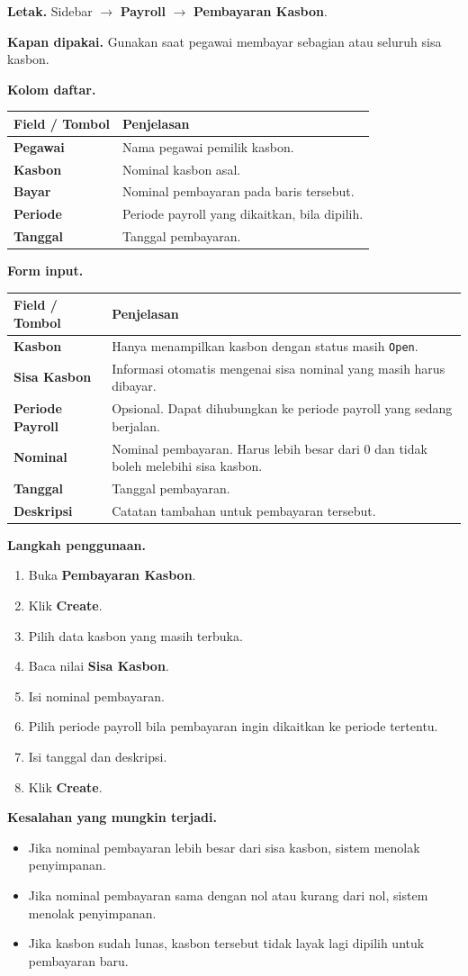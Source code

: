 \documentclass[12pt,a4paper]{article}
\providecommand{\textrightarrow}{\ensuremath{\rightarrow}}
\newcommand{\FieldTableStart}{
\begin{longtable}{L{0.30\textwidth}L{0.64\textwidth}}
\toprule
\textbf{Field / Tombol} & \textbf{Penjelasan} \\
\midrule
\endhead
}
\newcommand{\FieldTableEnd}{
\bottomrule
\end{longtable}
}
\newcommand{\FieldRow}[2]{
\textbf{#1} & #2 \\
}
\begin{document}
\textbf{Letak.} Sidebar \textrightarrow{} \textbf{Payroll} \textrightarrow{} \textbf{Pembayaran Kasbon}.

\textbf{Kapan dipakai.} Gunakan saat pegawai membayar sebagian atau seluruh sisa kasbon.

\textbf{Kolom daftar.}
\FieldTableStart
\FieldRow{Pegawai}{Nama pegawai pemilik kasbon.}
\FieldRow{Kasbon}{Nominal kasbon asal.}
\FieldRow{Bayar}{Nominal pembayaran pada baris tersebut.}
\FieldRow{Periode}{Periode payroll yang dikaitkan, bila dipilih.}
\FieldRow{Tanggal}{Tanggal pembayaran.}
\FieldTableEnd

\textbf{Form input.}
\FieldTableStart
\FieldRow{Kasbon}{Hanya menampilkan kasbon dengan status masih \texttt{Open}.}
\FieldRow{Sisa Kasbon}{Informasi otomatis mengenai sisa nominal yang masih harus dibayar.}
\FieldRow{Periode Payroll}{Opsional. Dapat dihubungkan ke periode payroll yang sedang berjalan.}
\FieldRow{Nominal}{Nominal pembayaran. Harus lebih besar dari 0 dan tidak boleh melebihi sisa kasbon.}
\FieldRow{Tanggal}{Tanggal pembayaran.}
\FieldRow{Deskripsi}{Catatan tambahan untuk pembayaran tersebut.}
\FieldTableEnd

\textbf{Langkah penggunaan.}
\begin{enumerate}
    \item Buka \textbf{Pembayaran Kasbon}.
    \item Klik \textbf{Create}.
    \item Pilih data kasbon yang masih terbuka.
    \item Baca nilai \textbf{Sisa Kasbon}.
    \item Isi nominal pembayaran.
    \item Pilih periode payroll bila pembayaran ingin dikaitkan ke periode tertentu.
    \item Isi tanggal dan deskripsi.
    \item Klik \textbf{Create}.
\end{enumerate}

\textbf{Kesalahan yang mungkin terjadi.}
\begin{itemize}
    \item Jika nominal pembayaran lebih besar dari sisa kasbon, sistem menolak penyimpanan.
    \item Jika nominal pembayaran sama dengan nol atau kurang dari nol, sistem menolak penyimpanan.
    \item Jika kasbon sudah lunas, kasbon tersebut tidak layak lagi dipilih untuk pembayaran baru.
\end{itemize}
\end{document}
